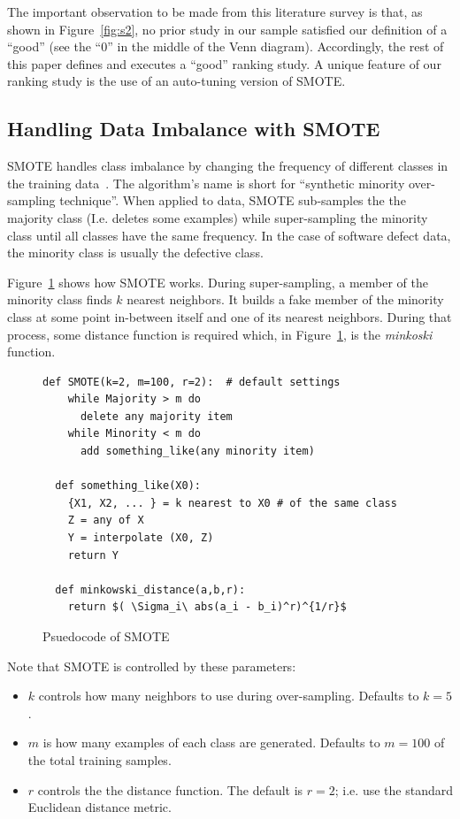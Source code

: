 \documentclass[10pt,conference]{IEEEtran}
\newcommand{\bi}{\begin{itemize}[leftmargin=0.4cm]}
\newcommand{\ei}{\end{itemize}}
\theoremstyle{break}
\theoremstyle{break}
\begin{document}
The important   observation to be made from  this literature
survey is that, as shown in Figure~\ref{fig:s2}, no prior study in our sample satisfied  our definition of a ``good'' (see the ``0'' in the middle of the Venn diagram).
Accordingly, the rest of this
paper defines and executes a ``good'' ranking  study. A unique feature of our
ranking study is the use of an auto-tuning version of SMOTE.
 
 
\subsection{Handling Data Imbalance with SMOTE}
\label{sect:smote}

SMOTE handles class imbalance by changing the frequency of different classes in the training
data~\cite{chawla2002smote}. 
The algorithm's name is short for ``synthetic minority over-sampling technique''.
When applied to data, SMOTE sub-samples the 
the majority class (I.e. deletes some examples)
while super-sampling the minority class
until
all classes have the same frequency.  In the case of software defect data,
the minority class is usually the  defective class.



Figure~\ref{fig:pseudocode} shows how SMOTE works. During super-sampling,
a member of the minority class finds $k$ nearest neighbors. It builds a fake member
of the minority class at some point in-between itself and one of its nearest
neighbors.  During that process, some distance function is required which, in Figure~\ref{fig:pseudocode}, is the {\em minkoski} function. 

\begin{figure}[!htbp]
\scriptsize
\begin{lstlisting}[mathescape,linewidth=8.2cm,frame=r,numbers=right]
  def SMOTE(k=2, m=100, r=2):  # default settings
    while Majority > m do
      delete any majority item
    while Minority < m do
      add something_like(any minority item)
      
  def something_like(X0): 
    {X1, X2, ... } = k nearest to X0 # of the same class
    Z = any of X
    Y = interpolate (X0, Z)
    return Y
    
  def minkowski_distance(a,b,r):
    return $( \Sigma_i\ abs(a_i - b_i)^r)^{1/r}$
\end{lstlisting}
\caption{Psuedocode of SMOTE}
\label{fig:pseudocode}  
\end{figure}

\noindent
Note that SMOTE is controlled by these  parameters:
\bi
\item $k$ controls how many neighbors to use during over-sampling. Defaults to $k=5$.
\item $m$ is how many examples of each class are generated. Defaults to $m=100$ of the total training samples.
\item $r$ controls the the distance function. The default is $r=2$;
i.e. use the  
standard Euclidean distance metric.
\ei
\end{document}
